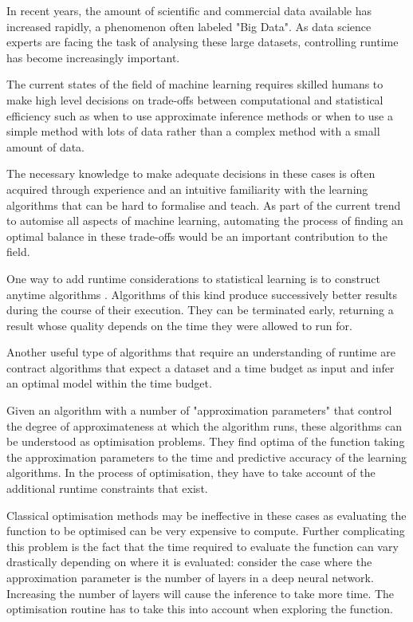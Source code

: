 \documentclass[a4paper,12pt,twoside,openright]{report}
\begin{document}
In recent years, the amount of scientific and commercial data available has increased rapidly, a phenomenon often labeled "Big Data". As data science experts are facing the task of analysing these large datasets, controlling runtime has become increasingly important.

The current states of the field of machine learning requires skilled humans to make high level decisions on trade-offs between computational and statistical efficiency such as when to use approximate inference methods or when to use a simple method with lots of data rather than a complex method with a small amount of data. 

The necessary knowledge to make adequate decisions in these cases is often acquired through experience and an intuitive familiarity with the learning algorithms that can be hard to formalise and teach. As part of the current trend to automise all aspects of machine learning, automating the process of finding an optimal balance in these trade-offs would be an important contribution to the field.


One way to add runtime considerations to statistical learning is to construct anytime algorithms \cite{conf/aaai/DeanB88}. Algorithms of this kind produce successively better results during the course of their execution. They can be terminated early, returning a result whose quality depends on the time they were allowed to run for.

Another useful type of algorithms that require an understanding of runtime are contract algorithms \cite{ZCCijcai99} that expect a dataset and a time budget as input and infer an optimal model within the time budget.



Given an algorithm with a number of "approximation parameters" that control the degree of approximateness at which the algorithm runs, these algorithms can be understood as optimisation problems. They find optima of the function taking the approximation parameters to the time and predictive accuracy of the learning algorithms. In the process of optimisation, they have to take account of the additional runtime constraints that exist.

Classical optimisation methods may be ineffective in these cases as evaluating the function to be optimised can be very expensive to compute. Further complicating this problem is the fact that the time required to evaluate the function can vary drastically depending on where it is evaluated: consider the case where the approximation parameter is the number of layers in a deep neural network. Increasing the number of layers will cause the inference to take more time. The optimisation routine has to take this into account when exploring the function. 
\end{document}
